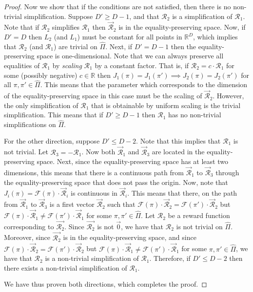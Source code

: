 \begin{proof}
Now we show that if the conditions are not satisfied, then there is no non-trivial simplification.
Suppose $D' \geq D-1$, and that $\mathcal{R}_2$ is a simplification of $\mathcal{R}_1$. Note that if $\mathcal{R}_2$ simplifies $\mathcal{R}_1$ then $\vec{\mathcal{R}}_2$ is in the equality-preserving space.
Now, if $D' = D$ then $L_2$ (and $L_1$) must be constant for all points in $\mathbb{R}^D$, which implies that $\mathcal{R}_2$ (and $\mathcal{R}_1$) are trivial on $\hat{\Pi}$. Next, if $D' = D - 1$ then the equality-preserving space is one-dimensional.
Note that we can always preserve all equalities of $\mathcal{R}_1$ by \emph{scaling} $\mathcal{R}_1$ by a constant factor. That is, if $\mathcal{R}_2 = c \cdot \mathcal{R}_1$ for some (possibly negative) $c \in \mathbb{R}$ then $J_1(\pi) = J_1(\pi') \implies J_2(\pi) = J_2(\pi')$ for all $\pi,\pi' \in \hat{\Pi}$. This means that the parameter which corresponds to the dimension of the equality-preserving space in this case must be the scaling of $\vec{\mathcal{R}}_2$. However, the only simplification of $\mathcal{R}_1$ that is obtainable by uniform scaling is the trivial simplification. This means that if $D' \geq D-1$ then $\mathcal{R}_1$ has no non-trivial simplifications on $\hat{\Pi}$.

For the other direction, suppose $D' \leq D-2$. Note that this implies that $\mathcal{R}_1$ is not trivial.
Let $\mathcal{R}_3 = -\mathcal{R}_1$. Now both $\vec{\mathcal{R}}_1$ and $\vec{\mathcal{R}}_3$ are located in the equality-preserving space. Next, since the equality-preserving space has at least two dimensions, this means that there is a continuous path from $\vec{\mathcal{R}}_1$ to $\vec{\mathcal{R}}_3$ through the equality-preserving space that does not pass the origin.
Now, note that $J_i(\pi) = \mathcal{F}(\pi)\cdot\vec{\mathcal{R}}_i$ is continuous in $\vec{\mathcal{R}}_i$.
This means that there, on the path from $\vec{\mathcal{R}}_1$ to $\vec{\mathcal{R}}_3$ is a first vector $\vec{\mathcal{R}}_2$ such that $\mathcal{F}(\pi)\cdot\vec{\mathcal{R}}_2 = \mathcal{F}(\pi')\cdot\vec{\mathcal{R}}_2$ but $\mathcal{F}(\pi)\cdot\vec{\mathcal{R}}_1 \neq \mathcal{F}(\pi')\cdot\vec{\mathcal{R}}_1$ for some $\pi,\pi' \in \hat{\Pi}$. 
Let $\mathcal{R}_2$ be a reward function corresponding to $\vec{\mathcal{R}_2}$. Since $\vec{\mathcal{R}_2}$ is not $\vec{0}$, we have that $\mathcal{R}_2$ is not trivial on $\hat{\Pi}$. Moreover, since $\vec{\mathcal{R}_2}$ is in the equality-preserving space, and since $\mathcal{F}(\pi)\cdot\vec{\mathcal{R}}_2 = \mathcal{F}(\pi')\cdot\vec{\mathcal{R}}_2$ but $\mathcal{F}(\pi)\cdot\vec{\mathcal{R}}_1 \neq \mathcal{F}(\pi')\cdot\vec{\mathcal{R}}_1$ for some $\pi,\pi' \in \hat{\Pi}$, we have that $\mathcal{R}_2$ is a non-trivial simplification of $\mathcal{R}_1$. Therefore, if $D' \leq D-2$ then there exists a non-trivial simplification of $\mathcal{R}_1$.

We have thus proven both directions, which completes the proof.
\end{proof}


